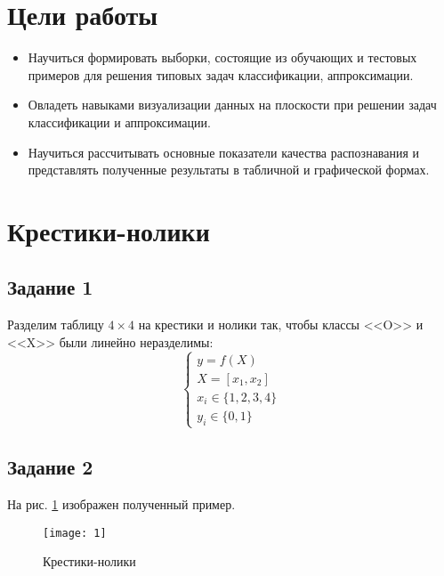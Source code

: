 





\tableofcontents
\newpage
\listoffigures
\newpage

\section{Цели работы}

\begin{itemize}
	\setlength\itemsep{0em}
	\item Научиться формировать выборки, состоящие из обучающих и тестовых примеров
	для решения типовых задач классификации, аппроксимации.
	\item Овладеть навыками визуализации данных на плоскости при решении задач
	классификации и аппроксимации.
	\item Научиться рассчитывать основные показатели качества распознавания и
	представлять полученные результаты в табличной и графической формах.
\end{itemize}

\section{Крестики-нолики}

\subsection{Задание 1}

Разделим таблицу $4\times 4$ на крестики и нолики так, чтобы классы <<O>> и <<X>> были линейно неразделимы:
\begin{equation*}
\begin{cases}
	y = f(X)\\
	X = [x_1, x_2]\\
	x_i \in \{1, 2, 3, 4\}\\
	y_i \in \{0, 1\}
\end{cases}
\end{equation*}

\subsection{Задание 2}

На рис. \ref{fig:tic-tac-toe} изображен полученный пример.

\begin{figure}[H]
\begin{center}
	\texttt{[image: 1]}
	\caption{Крестики-нолики}
	\label{fig:tic-tac-toe}
\end{center}
\end{figure}


